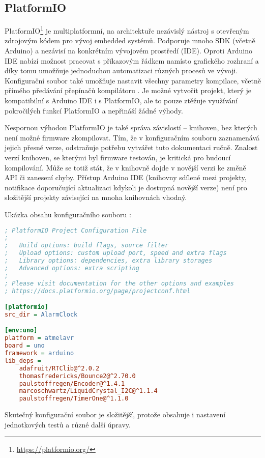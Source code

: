 \subsection{PlatformIO}
PlatformIO\footnote{\url{https://platformio.org/}} je multiplatformní, na
architektuře nezávislý nástroj s otevřeným zdrojovým kódem pro vývoj embedded
systémů. Podporuje mnoho SDK (včetně Arduino) a nezávisí na konkrétním
vývojovém prostředí (IDE). Oproti Arduino IDE nabízí možnost pracovat
s příkazovým řádkem namísto grafického rozhraní a díky tomu umožňuje
jednoduchou automatizaci různých procesů ve vývoji. Konfigurační soubor
 také umožňuje nastavit všechny parametry kompilace,
včetně přímého předávání přepínačů kompilátoru . Je možné
vytvořit projekt, který je kompatibilní s Arduino IDE i s PlatformIO, ale to
pouze ztěžuje využívání pokročilých funkcí PlatformIO a nepřináší žádné výhody.

Nespornou výhodou PlatformIO je také správa závislostí -- knihoven, bez kterých
není možné firmware zkompilovat. Tím, že v konfiguračním souboru
 zaznamenává jejich přesné verze, odstraňuje potřebu
vytvářet tuto dokumentaci ručně. Znalost verzí knihoven, se kterými byl
firmware testován, je kritická pro budoucí kompilování. Může se totiž stát, že
v knihovně dojde v novější verzi ke změně API či zanesení chyby. Přístup
Arduino IDE (knihovny sdílené mezi projekty, notifikace doporučující
aktualizaci kdykoli je dostupná novější verze) není pro složitější projekty
závisející na mnoha knihovnách vhodný.

Ukázka obsahu konfiguračního souboru :
\begin{lstlisting}[language=Ini]
; PlatformIO Project Configuration File
;
;   Build options: build flags, source filter
;   Upload options: custom upload port, speed and extra flags
;   Library options: dependencies, extra library storages
;   Advanced options: extra scripting
;
; Please visit documentation for the other options and examples
; https://docs.platformio.org/page/projectconf.html

[platformio]
src_dir = AlarmClock

[env:uno]
platform = atmelavr
board = uno
framework = arduino
lib_deps = 
	adafruit/RTClib@^2.0.2
	thomasfredericks/Bounce2@^2.70.0
	paulstoffregen/Encoder@^1.4.1
	marcoschwartz/LiquidCrystal_I2C@^1.1.4
	paulstoffregen/TimerOne@^1.1.0
\end{lstlisting}
Skutečný konfigurační soubor je složitější, protože obsahuje i nastavení
jednotkových testů a různé další úpravy.

